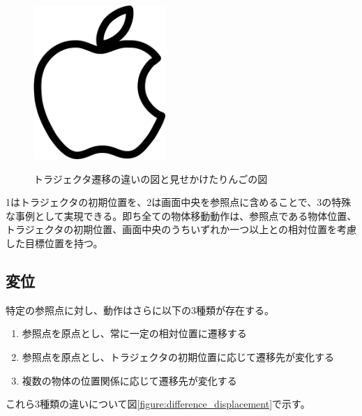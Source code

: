 	\begin{figure}
		\begin{center}
			\includegraphics[width=5cm]{appele.png} \\ %
			\caption{トラジェクタ遷移の違いの図と見せかけたりんごの図}
			\label{figure:moving_trajector}
		\end{center}
	\end{figure}


1はトラジェクタの初期位置を、2は画面中央を参照点に含めることで、3の特殊な事例として実現できる。即ち全ての物体移動動作は、参照点である物体位置、トラジェクタの初期位置、画面中央のうちいずれか一つ以上との相対位置を考慮した目標位置を持つ。

\subsection{変位}

特定の参照点に対し、動作はさらに以下の3種類が存在する。

	\begin{enumerate}
		\item 参照点を原点とし、常に一定の相対位置に遷移する
		\item 参照点を原点とし、トラジェクタの初期位置に応じて遷移先が変化する
		\item 複数の物体の位置関係に応じて遷移先が変化する
	\end{enumerate}
これら3種類の違いについて図\ref{figure:difference_displacement}で示す。

